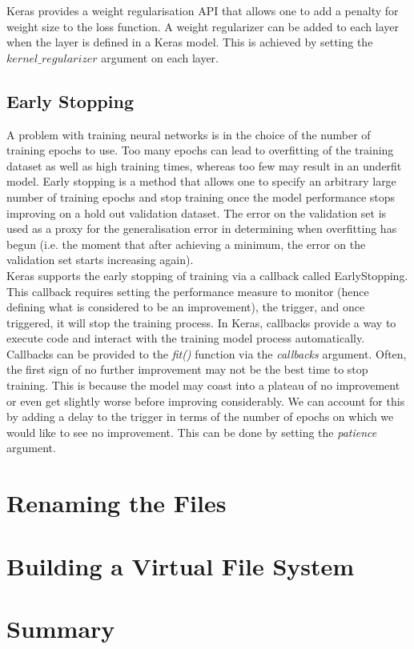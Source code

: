 Keras provides a weight regularisation API that allows one to add a penalty for weight size to the loss function. A weight regularizer can be added to each layer when the layer is defined in a Keras model. This is achieved by setting the $kernel\_regularizer$ argument on each layer.

\subsection{Early Stopping}
A problem with training neural networks is in the choice of the number of training epochs to use. Too many epochs can lead to overfitting of the training dataset as well as high training times, whereas too few may result in an underfit model. Early stopping is a method that allows one to specify an arbitrary large number of training epochs and stop training once the model performance stops improving on a hold out validation dataset. The error on the validation set is used as a proxy for the generalisation error in determining when overfitting has begun (i.e. the moment that after achieving a minimum, the error on the validation set starts increasing again).\\

Keras supports the early stopping of training via a callback called EarlyStopping. This callback requires setting the performance measure to monitor (hence defining what is considered to be an improvement), the trigger, and once triggered, it will stop the training process. In Keras, callbacks provide a way to execute code and interact with the training model process automatically. Callbacks can be provided to the \textit{fit()} function via the \textit{callbacks} argument. Often, the first sign of no further improvement may not be the best time to stop training. This is because the model may coast into a plateau of no improvement or even get slightly worse before improving considerably. We can account for this by adding a delay to the trigger in terms of the number of epochs on which we would like to see no improvement. This can be done by setting the \textit{patience} argument. \\


\section{Renaming the Files}

\section{Building a Virtual File System}


\section{Summary}


